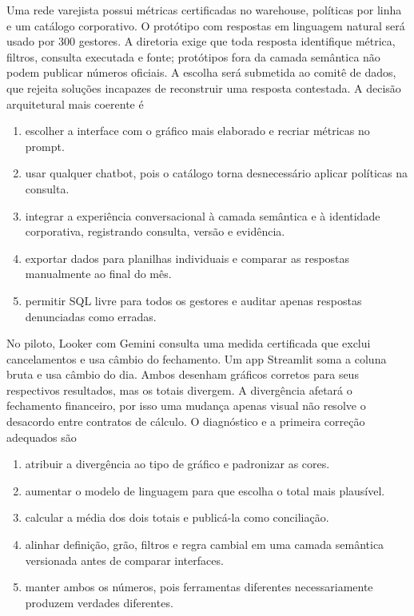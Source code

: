 \TextoBase
Uma rede varejista possui métricas certificadas no warehouse, políticas por linha e um catálogo corporativo. O protótipo com respostas em linguagem natural será usado por 300 gestores. A diretoria exige que toda resposta identifique métrica, filtros, consulta executada e fonte; protótipos fora da camada semântica não podem publicar números oficiais.
A escolha será submetida ao comitê de dados, que rejeita soluções incapazes de reconstruir uma resposta contestada.
\FonteDidatica
\Comando A decisão arquitetural mais coerente é
\begin{enumerate}[label=\Alph*)]
\item escolher a interface com o gráfico mais elaborado e recriar métricas no prompt.
\item usar qualquer chatbot, pois o catálogo torna desnecessário aplicar políticas na consulta.
\item integrar a experiência conversacional à camada semântica e à identidade corporativa, registrando consulta, versão e evidência.
\item exportar dados para planilhas individuais e comparar as respostas manualmente ao final do mês.
\item permitir SQL livre para todos os gestores e auditar apenas respostas denunciadas como erradas.
\end{enumerate}

\TextoBase
No piloto, Looker com Gemini consulta uma medida certificada que exclui cancelamentos e usa câmbio do fechamento. Um app Streamlit soma a coluna bruta e usa câmbio do dia. Ambos desenham gráficos corretos para seus respectivos resultados, mas os totais divergem.
A divergência afetará o fechamento financeiro, por isso uma mudança apenas visual não resolve o desacordo entre contratos de cálculo.
\FonteDidatica
\Comando O diagnóstico e a primeira correção adequados são
\begin{enumerate}[label=\Alph*)]
\item atribuir a divergência ao tipo de gráfico e padronizar as cores.
\item aumentar o modelo de linguagem para que escolha o total mais plausível.
\item calcular a média dos dois totais e publicá-la como conciliação.
\item alinhar definição, grão, filtros e regra cambial em uma camada semântica versionada antes de comparar interfaces.
\item manter ambos os números, pois ferramentas diferentes necessariamente produzem verdades diferentes.
\end{enumerate}

